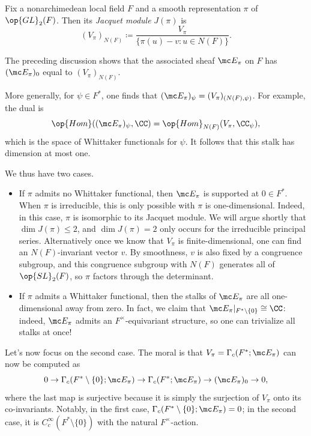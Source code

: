 \documentclass[../notes.tex]{subfiles}
\begin{document}
\begin{definition}
	Fix a nonarchimedean local field $F$ and a smooth representation $\pi$ of $\op{GL}_2(F)$. Then its \textit{Jacquet module} $J(\pi)$ is
	\[(V_\pi)_{N(F)}\coloneqq\frac{V_\pi}{\{\pi(u)-v:u\in N(F)\}}.\]
\end{definition}
\begin{remark}
	The preceding discussion shows that the associated sheaf $\mc E_\pi$ on $F$ has $(\mc E_\pi)_0$ equal to $(V_\pi)_{N(F)}$.
\end{remark}
\begin{remark}
	More generally, for $\psi\in F^*$, one finds that $(\mc E_\pi)_\psi=(V_\pi)_{(N(F),\psi)}$. For example, the dual is
	\[\op{Hom}((\mc E_\pi)_\psi,\CC)=\op{Hom}_{N(F)}(V_\pi,\CC_\psi),\]
	which is the space of Whittaker functionals for $\psi$. It follows that this stalk has dimension at most one.
\end{remark}
We thus have two cases.
\begin{itemize}
	\item If $\pi$ admits no Whittaker functional, then $\mc E_\pi$ is supported at $0\in F^*$. When $\pi$ is irreducible, this is only possible with $\pi$ is one-dimensional. Indeed, in this case, $\pi$ is isomorphic to its Jacquet module. We will argue shortly that $\dim J(\pi)\le2$, and $\dim J(\pi)=2$ only occurs for the irreducible principal series. Alternatively once we know that $V_\pi$ is finite-dimensional, one can find an $N(F)$-invariant vector $v$. By smoothness, $v$ is also fixed by a congruence subgroup, and this congruence subgroup with $N(F)$ generates all of $\op{SL}_2(F)$, so $\pi$ factors through the determinant.
	\item If $\pi$ admits a Whittaker functional, then the stalks of $\mc E_\pi$ are all one-dimensional away from zero. In fact, we claim that $\mc E_\pi|_{F^*\setminus\{0\}}\cong\CC$: indeed, $\mc E_\pi$ admits an $F^\times$-equivariant structure, so one can trivialize all stalks at once!
\end{itemize}
Let's now focus on the second case. The moral is that $V_\pi=\Gamma_c(F^*;\mc E_\pi)$ can now be computed as
\[0\to\Gamma_c(F^*\setminus\{0\};\mc E_\pi)\to\Gamma_c(F^*;\mc E_\pi)\to(\mc E_\pi)_0\to0,\]
where the last map is surjective because it is simply the surjection of $V_\pi$ onto its co-invariants. Notably, in the first case, $\Gamma_c(F^*\setminus\{0\};\mc E_\pi)=0$; in the second case, it is $C_c^\infty(F^*\setminus\{0\})$ with the natural $F^\times$-action.
\end{document}
